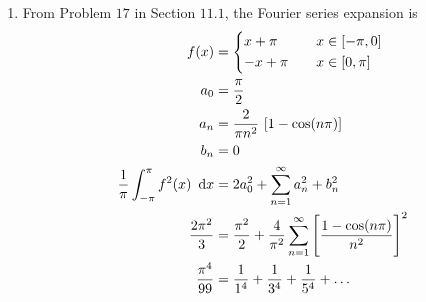 \begin{enumerate}
    \item From Problem $ 17 $ in Section $ 11.1 $, the Fourier series expansion is
          \begin{align}
              f(x)             & =  \begin{dcases}
                                        x + \pi  & \quad x \in [-\pi, 0] \\
                                        -x + \pi & \quad x \in [0, \pi]  \\
                                    \end{dcases}             \\
              a_0              & = \frac{\pi}{2}                                 \\
              a_n              & = \frac{2}{\pi n^2}\ [1 - \cos(n\pi)]           \\
              b_n              & = 0                                             \\
              \frac{1}{\pi} \int_{-\pi}^{\pi}f^2(x)
              \ \dl x          & = 2a_0^2 + \iser[n]{1} a_n^2 + b_n^2            \\
              \frac{2\pi^2}{3} & = \frac{\pi^2}{2} + \frac{4}{\pi^2} \iser[n]{1}
              \Bigg[\frac{1-\cos(n\pi)}{n^2}\Bigg]^2                             \\
              \frac{\pi^4}{99} & = \frac{1}{1^4} + \frac{1}{3^4} + \frac{1}{5^4}
              + \dots
          \end{align}
          \mytablethree
          \begin{figure}[H]
              \centering
              \begin{tikzpicture}

\end{tikzpicture}
\end{figure}
\end{enumerate}
